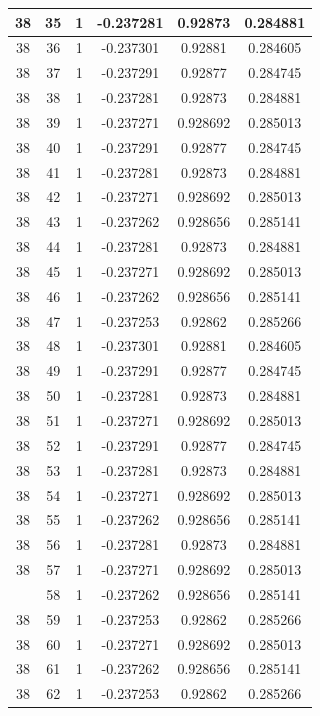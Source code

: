 \documentclass[12pt,a4paper]{article}
\numberwithin{equation}{section}
\numberwithin{figure}{section}
\numberwithin{table}{section}
\begin{document}
\begin{longtable}{|c|c|c|c|c|c|}
38 & 35 & 1 & -0.237281 & 0.92873 & 0.284881 \\ \hline
38 & 36 & 1 & -0.237301 & 0.92881 & 0.284605 \\ \hline
38 & 37 & 1 & -0.237291 & 0.92877 & 0.284745 \\ \hline
38 & 38 & 1 & -0.237281 & 0.92873 & 0.284881 \\ \hline
38 & 39 & 1 & -0.237271 & 0.928692 & 0.285013 \\ \hline
38 & 40 & 1 & -0.237291 & 0.92877 & 0.284745 \\ \hline
38 & 41 & 1 & -0.237281 & 0.92873 & 0.284881 \\ \hline
38 & 42 & 1 & -0.237271 & 0.928692 & 0.285013 \\ \hline
38 & 43 & 1 & -0.237262 & 0.928656 & 0.285141 \\ \hline
38 & 44 & 1 & -0.237281 & 0.92873 & 0.284881 \\ \hline
38 & 45 & 1 & -0.237271 & 0.928692 & 0.285013 \\ \hline
38 & 46 & 1 & -0.237262 & 0.928656 & 0.285141 \\ \hline
38 & 47 & 1 & -0.237253 & 0.92862 & 0.285266 \\ \hline
38 & 48 & 1 & -0.237301 & 0.92881 & 0.284605 \\ \hline
38 & 49 & 1 & -0.237291 & 0.92877 & 0.284745 \\ \hline
38 & 50 & 1 & -0.237281 & 0.92873 & 0.284881 \\ \hline
38 & 51 & 1 & -0.237271 & 0.928692 & 0.285013 \\ \hline
38 & 52 & 1 & -0.237291 & 0.92877 & 0.284745 \\ \hline
38 & 53 & 1 & -0.237281 & 0.92873 & 0.284881 \\ \hline
38 & 54 & 1 & -0.237271 & 0.928692 & 0.285013 \\ \hline
38 & 55 & 1 & -0.237262 & 0.928656 & 0.285141 \\ \hline
38 & 56 & 1 & -0.237281 & 0.92873 & 0.284881 \\ \hline
38 & 57 & 1 & -0.237271 & 0.928692 & 0.285013 \\ \hline
\pagebreak
38 & 58 & 1 & -0.237262 & 0.928656 & 0.285141 \\ \hline
38 & 59 & 1 & -0.237253 & 0.92862 & 0.285266 \\ \hline
38 & 60 & 1 & -0.237271 & 0.928692 & 0.285013 \\ \hline
38 & 61 & 1 & -0.237262 & 0.928656 & 0.285141 \\ \hline
38 & 62 & 1 & -0.237253 & 0.92862 & 0.285266 \\ \hline

\end{longtable}
\end{document}
